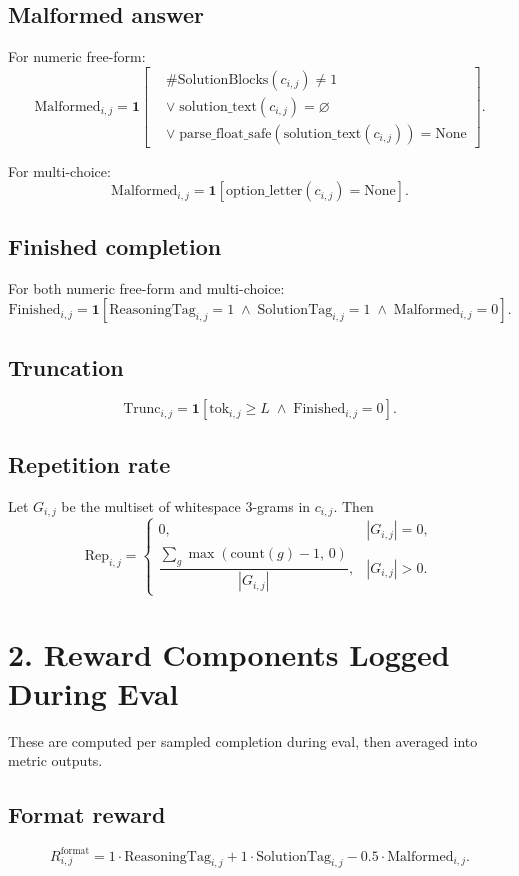 \documentclass[11pt]{article}
\newcommand{\ind}{\mathbf{1}}
\newcommand{\None}{\mathrm{None}}
\begin{document}
\subsection*{Malformed answer}
For numeric free-form:
\[
\mathrm{Malformed}_{i,j}
=
\ind\!\left[
\begin{aligned}
&\#\mathrm{SolutionBlocks}(c_{i,j}) \neq 1 \\
&\vee\; \mathrm{solution\_text}(c_{i,j}) = \varnothing \\
&\vee\; \mathrm{parse\_float\_safe}(\mathrm{solution\_text}(c_{i,j})) = \None
\end{aligned}
\right].
\]

For multi-choice:
\[
\mathrm{Malformed}_{i,j}
=
\ind\!\left[
\mathrm{option\_letter}(c_{i,j}) = \None
\right].
\]

\subsection*{Finished completion}
For both numeric free-form and multi-choice:
\[
\mathrm{Finished}_{i,j}
=
\ind\!\left[
\mathrm{ReasoningTag}_{i,j}=1
\;\wedge\;
\mathrm{SolutionTag}_{i,j}=1
\;\wedge\;
\mathrm{Malformed}_{i,j}=0
\right].
\]

\subsection*{Truncation}
\[
\mathrm{Trunc}_{i,j}
=
\ind\!\left[
\mathrm{tok}_{i,j} \ge L
\;\wedge\;
\mathrm{Finished}_{i,j}=0
\right].
\]

\subsection*{Repetition rate}
Let $G_{i,j}$ be the multiset of whitespace 3-grams in $c_{i,j}$. Then
\[
\mathrm{Rep}_{i,j}
=
\begin{cases}
0, & |G_{i,j}| = 0, \\
\dfrac{\sum_{g} \max(\mathrm{count}(g)-1,\,0)}{|G_{i,j}|}, & |G_{i,j}| > 0.
\end{cases}
\]

\section*{2. Reward Components Logged During Eval}
These are computed per sampled completion during eval, then averaged into metric outputs.

\subsection*{Format reward}
\[
R^{\mathrm{format}}_{i,j}
=
1 \cdot \mathrm{ReasoningTag}_{i,j}
+
1 \cdot \mathrm{SolutionTag}_{i,j}
-
0.5 \cdot \mathrm{Malformed}_{i,j}.
\]
\end{document}
